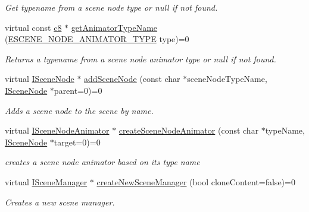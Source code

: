 \begin{DoxyCompactItemize}
\begin{DoxyCompactList}\small\item\em Get typename from a scene node type or null if not found. \end{DoxyCompactList}\item 
\mbox{\label{classirr_1_1scene_1_1ISceneManager_aeedfa596280048e6ea6463ff69d23855}} 
virtual const \hyperlink{namespaceirr_a9395eaea339bcb546b319e9c96bf7410}{c8} $\ast$ \hyperlink{classirr_1_1scene_1_1ISceneManager_aeedfa596280048e6ea6463ff69d23855}{get\+Animator\+Type\+Name} (\hyperlink{namespaceirr_1_1scene_a327a1e43872705cf8f3f3342fb307d19}{E\+S\+C\+E\+N\+E\+\_\+\+N\+O\+D\+E\+\_\+\+A\+N\+I\+M\+A\+T\+O\+R\+\_\+\+T\+Y\+PE} type)=0
\begin{DoxyCompactList}\small\item\em Returns a typename from a scene node animator type or null if not found. \end{DoxyCompactList}\item 
virtual \hyperlink{classirr_1_1scene_1_1ISceneNode}{I\+Scene\+Node} $\ast$ \hyperlink{classirr_1_1scene_1_1ISceneManager_a22ea17e8c06a773af9828f7bb70cdc40}{add\+Scene\+Node} (const char $\ast$scene\+Node\+Type\+Name, \hyperlink{classirr_1_1scene_1_1ISceneNode}{I\+Scene\+Node} $\ast$parent=0)=0
\begin{DoxyCompactList}\small\item\em Adds a scene node to the scene by name. \end{DoxyCompactList}\item 
virtual \hyperlink{classirr_1_1scene_1_1ISceneNodeAnimator}{I\+Scene\+Node\+Animator} $\ast$ \hyperlink{classirr_1_1scene_1_1ISceneManager_ac63c38a05b8e7d0a11ddb1752da36835}{create\+Scene\+Node\+Animator} (const char $\ast$type\+Name, \hyperlink{classirr_1_1scene_1_1ISceneNode}{I\+Scene\+Node} $\ast$target=0)=0
\begin{DoxyCompactList}\small\item\em creates a scene node animator based on its type name \end{DoxyCompactList}\item 
virtual \hyperlink{classirr_1_1scene_1_1ISceneManager}{I\+Scene\+Manager} $\ast$ \hyperlink{classirr_1_1scene_1_1ISceneManager_a94805dd4eca41ccef9607aefe669aed9}{create\+New\+Scene\+Manager} (bool clone\+Content=false)=0
\begin{DoxyCompactList}\small\item\em Creates a new scene manager. \end{DoxyCompactList}\item 

\end{DoxyCompactItemize}
